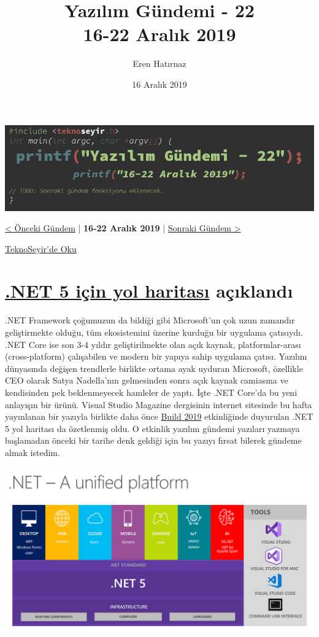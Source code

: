\documentclass[11pt]{article}
\author{Eren Hatırnaz}
\date{16 Aralık 2019}
\title{Yazılım Gündemi - 22\\\medskip
\large 16-22 Aralık 2019}
\begin{document}
\maketitle
\tableofcontents \clearpage\shorthandoff{=}

\begin{center}
\includegraphics[width=.9\linewidth]{gorseller/yazilim-gundemi-banner.png}
\end{center}

\begin{center}
\href{../21/yazilim-gundemi-21.pdf}{< Önceki Gündem} | \textbf{16-22 Aralık 2019} | \href{../23/yazilim-gundemi-23.pdf}{Sonraki Gündem >}

\href{https://teknoseyir.com/blog/yazilim-gundemi-22-16-22-aralik-2019}{TeknoSeyir'de Oku}
\end{center}

\section{\href{https://visualstudiomagazine.com/articles/2019/12/17/net-5-next.aspx}{.NET 5 için yol haritası} açıklandı}
\label{sec:org3cf9aae}
.NET Framework çoğumuzun da bildiği gibi Microsoft'un çok uzun zamandır
geliştirmekte olduğu, tüm ekosistemini üzerine kurduğu bir uygulama çatısıydı.
.NET Core ise son 3-4 yıldır geliştirilmekte olan açık kaynak,
platformlar-arası (cross-platform) çalışabilen ve modern bir yapıya sahip
uygulama çatısı. Yazılım dünyasında değişen trendlerle birlikte ortama ayak
uyduran Microsoft, özellikle CEO olarak Satya Nadella'nın gelmesinden sonra
açık kaynak camiasına ve kendisinden pek beklenmeyecek hamleler de yaptı. İşte
.NET Core'da bu yeni anlayışın bir ürünü. Visual Studio Magazine dergisinin
internet sitesinde bu hafta yayınlanan bir yazıyla birlikte daha önce \href{https://news.microsoft.com/build2019/}{Build
2019} etkinliğinde duyurulan .NET 5 yol haritası da özetlenmiş oldu. O etkinlik
yazılım gündemi yazıları yazmaya başlamadan önceki bir tarihe denk geldiği için
bu yazıyı fırsat bilerek gündeme almak istedim.

\begin{center}
\includegraphics[width=.9\linewidth]{gorseller/dotnet5_platform.png}
\end{center}
\end{document}
